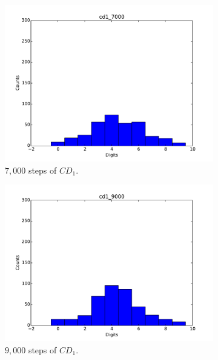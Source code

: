 \begin{figure}[hbt]
\begin{subfigure}[t]{0.18\textwidth}
  			\includegraphics[width=\textwidth]{pics_sdbn/gibbs_cd1_7000.pdf}
  		    \caption{$7,000$ steps of $CD_1$.}
  		\end{subfigure}
  		\begin{subfigure}[t]{0.18\textwidth}
  			\includegraphics[width=\textwidth]{pics_sdbn/gibbs_cd1_9000.pdf}
  		    \caption{$9,000$ steps of $CD_1$.}
  		\end{subfigure}\\
  		\begin{subfigure}[t]{0.18\textwidth}

\end{subfigure}
\end{figure}
